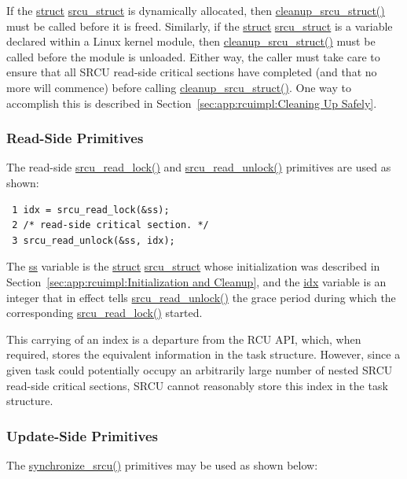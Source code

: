 If the \url{struct} \url{srcu_struct} is dynamically allocated, then
\url{cleanup_srcu_struct()} must be called before it is freed.
Similarly, if the \url{struct} \url{srcu_struct} is a variable declared within
a Linux kernel module, then \url{cleanup_srcu_struct()} must be called
before the module is unloaded.
Either way, the caller must take care to ensure that all SRCU read-side
critical sections have completed (and that no more will commence) before
calling \url{cleanup_srcu_struct()}.
One way to accomplish this is described in
Section~\ref{sec:app:rcuimpl:Cleaning Up Safely}.

\subsubsection{Read-Side Primitives}
\label{sec:app:rcuimpl:Read-Side Primitives}

The read-side \url{srcu_read_lock()} and \url{srcu_read_unlock()} primitives
are used as shown:

\vspace{5pt}
\begin{minipage}[t]{\columnwidth}
\small
\begin{verbatim}
 1 idx = srcu_read_lock(&ss);
 2 /* read-side critical section. */
 3 srcu_read_unlock(&ss, idx);
\end{verbatim}
\end{minipage}
\vspace{5pt}

The \url{ss} variable is the \url{struct} \url{srcu_struct} whose initialization
was described in Section~\ref{sec:app:rcuimpl:Initialization and Cleanup},
and the \url{idx} variable is an integer that in effect tells
\url{srcu_read_unlock()} the grace period during which the corresponding
\url{srcu_read_lock()} started.

This carrying of an index is a departure from the RCU API, which,
when required, stores the equivalent information in the task structure.
However, since a given task could potentially occupy an arbitrarily large
number of nested SRCU read-side critical sections, SRCU cannot
reasonably store this index in the task structure.

\subsubsection{Update-Side Primitives}
\label{sec:app:rcuimpl:Update-Side Primitives}

The \url{synchronize_srcu()} primitives may be used as shown below:

